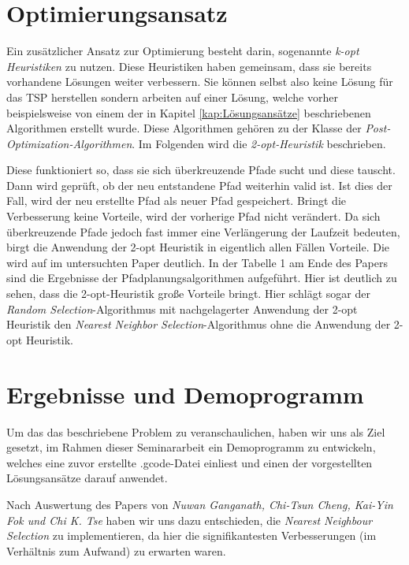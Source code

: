 \documentclass[12pt, a4paper]{article}
\begin{document}
\newpage
\section{Optimierungsansatz \label{kap:Heuristik}}
Ein zusätzlicher Ansatz zur Optimierung besteht darin, sogenannte \textit{k-opt Heuristiken} zu nutzen. Diese Heuristiken haben gemeinsam, dass sie bereits vorhandene Lösungen weiter verbessern. Sie können selbst also keine Lösung für das TSP herstellen sondern arbeiten auf einer Lösung, welche vorher beispielsweise von einem der in Kapitel \ref{kap:Lösungsansätze} beschriebenen Algorithmen erstellt wurde. Diese Algorithmen gehören zu der Klasse der \textit{Post-Optimization-Algorithmen}. Im Folgenden wird die \textit{2-opt-Heuristik} beschrieben.

Diese funktioniert so, dass sie sich überkreuzende Pfade sucht und diese tauscht. Dann wird geprüft, ob der neu entstandene Pfad weiterhin valid ist. Ist dies der Fall, wird der neu erstellte Pfad als neuer Pfad gespeichert. Bringt die Verbesserung keine Vorteile, wird der vorherige Pfad nicht verändert. Da sich überkreuzende Pfade jedoch fast immer eine Verlängerung der Laufzeit bedeuten, birgt die Anwendung der 2-opt Heuristik in eigentlich allen Fällen Vorteile. Die wird auf im untersuchten Paper deutlich. In der Tabelle 1 am Ende des Papers \cite[TABLE I]{Paper.2016} sind die Ergebnisse der Pfadplanungsalgorithmen aufgeführt. Hier ist deutlich zu sehen, dass die 2-opt-Heuristik große Vorteile bringt. Hier schlägt sogar der \textit{Random Selection}-Algorithmus mit nachgelagerter Anwendung der 2-opt Heuristik den \textit{Nearest Neighbor Selection}-Algorithmus ohne die Anwendung der 2-opt Heuristik.

\newpage
\section{Ergebnisse und Demoprogramm \label{kap:Ergebnisse}}
Um das das beschriebene Problem zu veranschaulichen, haben wir uns als Ziel gesetzt, im Rahmen dieser Seminararbeit ein Demoprogramm zu entwickeln, welches eine zuvor erstellte .gcode-Datei einliest und einen der vorgestellten Lösungsansätze darauf anwendet. 

Nach Auswertung des Papers von \textit{Nuwan Ganganath, Chi-Tsun Cheng, Kai-Yin Fok und Chi K. Tse} \cite[vgl. Seite 290, TABLE I.]{Paper.2016} haben wir uns dazu entschieden, die \textit{Nearest Neighbour Selection} zu implementieren, da hier die signifikantesten Verbesserungen (im Verhältnis zum Aufwand) zu erwarten waren. 
\end{document}
